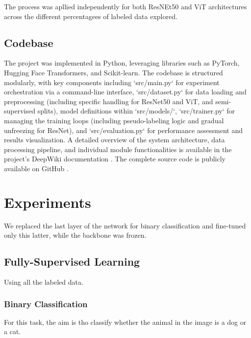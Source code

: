 \documentclass{article}
\begin{document}
The process was apllied independently for both ResNEt50 and ViT architectures across the different percentagees of labeled data explored. 

\subsection{Codebase}
The project was implemented in Python, leveraging libraries such as PyTorch, Hugging Face Transformers, and Scikit-learn. The codebase is structured modularly, with key components including `src/main.py` for experiment orchestration via a command-line interface, `src/dataset.py` for data loading and preprocessing (including specific handling for ResNet50 and ViT, and semi-supervised splits), model definitions within `src/models/`, `src/trainer.py` for managing the training loops (including pseudo-labeling logic and gradual unfreezing for ResNet), and `src/evaluation.py` for performance assessment and results visualization. A detailed overview of the system architecture, data processing pipeline, and individual module functionalities is available in the project's DeepWiki documentation \cite{OurProjectDeepWiki}. The complete source code is publicly available on GitHub \cite{OurProjectRepoGithub}.


\section{Experiments}
We replaced the last layer of the network for binary classification and fine-tuned only this latter, while the backbone was frozen.

\subsection{Fully-Supervised Learning}
Using all the labeled data.

\subsubsection{Binary Classification}
For this task, the aim is tho classify whether the animal in the image is a dog or a cat.
\end{document}
